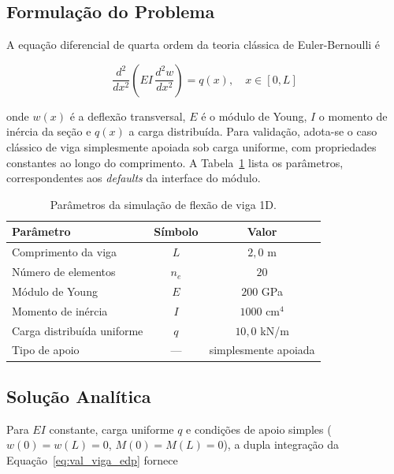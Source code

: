 \subsection{Formulação do Problema}

A equação diferencial de quarta ordem da teoria clássica de Euler-Bernoulli é

\begin{equation}
    \frac{d^2}{dx^2}\!\left( E I \, \frac{d^2 w}{dx^2} \right) = q(x), \quad x \in [0, L]
    \label{eq:val_viga_edp}
\end{equation}

\noindent onde $w(x)$ é a deflexão transversal, $E$ é o módulo de Young, $I$ o momento de inércia da seção e $q(x)$ a carga distribuída. Para validação, adota-se o caso clássico de viga simplesmente apoiada sob carga uniforme, com propriedades constantes ao longo do comprimento. A Tabela~\ref{tab:val_viga_params} lista os parâmetros, correspondentes aos \emph{defaults} da interface do módulo.

\begin{table}[htbp]
    \centering
    \caption{Parâmetros da simulação de flexão de viga 1D.}
    \label{tab:val_viga_params}
    \begin{tabular}{lcc}
        \hline
        \textbf{Parâmetro} & \textbf{Símbolo} & \textbf{Valor} \\
        \hline
        Comprimento da viga            & $L$   & $2{,}0$ m           \\
        Número de elementos            & $n_e$ & $20$                \\
        Módulo de Young                & $E$   & $200$ GPa           \\
        Momento de inércia             & $I$   & $1000$ cm$^{4}$     \\
        Carga distribuída uniforme     & $q$   & $10{,}0$ kN/m       \\
        Tipo de apoio                  & ---   & simplesmente apoiada \\
        \hline
    \end{tabular}
\end{table}

\subsection{Solução Analítica}

Para $E I$ constante, carga uniforme $q$ e condições de apoio simples ($w(0) = w(L) = 0$, $M(0) = M(L) = 0$), a dupla integração da Equação~\eqref{eq:val_viga_edp} fornece

